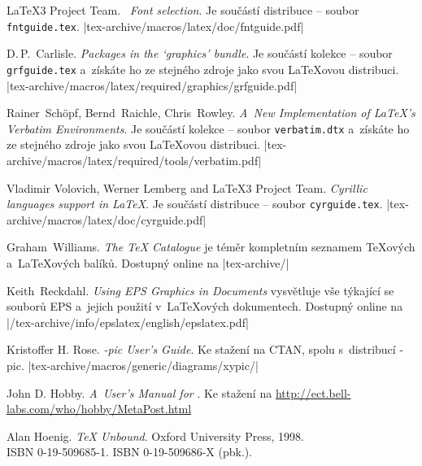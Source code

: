 \begin{thebibliography}{99}
 \LaTeX3 Project Team.  \newblock \emph{\LaTeXe~Font
    selection}.  \newblock Je součástí distribuce \LaTeXe{} -- soubor
  \texttt{fntguide.tex}. \CTANalt|tex-archive/macros/latex/doc/fntguide.pdf|

 D.\,P.~Carlisle.  \newblock \emph{Packages in the
    `graphics' bundle}.  \newblock Je součástí kolekce 
    -- soubor \texttt{grfguide.tex} a~získáte ho ze stejného zdroje
    jako svou \LaTeX ovou distribuci.
\CTANalt|tex-archive/macros/latex/required/graphics/grfguide.pdf|

 Rainer~Sch\"opf, Bernd~Raichle, Chris~Rowley.  
\newblock \emph{A~New Implementation of \LaTeX's Verbatim
  Environments}.
 \newblock Je součástí kolekce  -- soubor \texttt{verbatim.dtx}
 a~získáte ho ze stejného zdroje jako svou \LaTeX ovou distribuci.
 \CTANalt|tex-archive/macros/latex/required/tools/verbatim.pdf|

 Vladimir Volovich, Werner Lemberg and \LaTeX3 Project Team.                    
    \newblock \emph{Cyrillic languages support in \LaTeX}.                                        
    \newblock Je součástí distribuce \LaTeXe{} -- soubor
  \texttt{cyrguide.tex}.       
\CTANalt|tex-archive/macros/latex/doc/cyrguide.pdf|                                                                    

 Graham~Williams.  \newblock \emph{The \TeX{}
    Catalogue} je téměr kompletním seznamem \TeX ových a~\LaTeX ových
    balíků.
  \newblock Dostupný online na \CTANalt|tex-archive/|
  
 Keith~Reckdahl.  \newblock \emph{Using EPS Graphics in
    \LaTeXe{} Documents} vysvětluje vše týkající se souborů EPS a~jejich
    použití v~\LaTeX ových dokumentech.
    \newblock Dostupný online na \CTANalt|/tex-archive/info/epslatex/english/epslatex.pdf|

 Kristoffer H. Rose.
  \newblock \emph{\Xy-pic User's Guide}.  \newblock
  Ke stažení na CTAN, spolu s~distribucí \Xy-pic. 
\CTANalt|tex-archive/macros/generic/diagrams/xypic/|
  
 John D. Hobby.
  \newblock \emph{A~User's Manual for \MP}. \newblock
  Ke stažení na \url{http://ect.bell-labs.com/who/hobby/MetaPost.html} 
  
 Alan Hoenig.
  \newblock \emph{\TeX{} Unbound}. \newblock Oxford University Press, 1998.\\
    ISBN 0-19-509685-1. ISBN 0-19-509686-X (pbk.).
  

\end{thebibliography}
